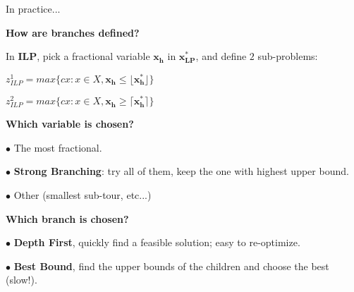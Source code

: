 \documentclass[13pt]{beamer}
\begin{document}

\begin{frame}{In practice...}
    \begin{fullpageitemize}
        \item<1->[\rtarrow]\textbf{How are branches defined?}
        \begin{baseitemize}
            \item<2->In \textbf{ILP}, pick a fractional variable $\mathbf{x_h}$ in $\mathbf{x^*_{LP}}$, and define $2$ sub-problems:
            \item<3->$z^1_{ILP} = max\{cx: x \in X, \mathbf{x_h \leq \lfloor x^*_h \rfloor}\}$
            \item<3->$z^2_{ILP} = max\{cx: x \in X, \mathbf{x_h \geq \lceil x^*_h \rceil}\}$
        \end{baseitemize}	
        \item<4->[\rtarrow]\textbf{Which variable is chosen?}
        \begin{baseitemize}
            \item<5->$\bullet$ The most fractional.
            \item<6->$\bullet$ \textbf{Strong Branching}: try all of them, keep the one with highest upper bound.
            \item<7->$\bullet$ Other (smallest sub-tour, etc...)
        \end{baseitemize}	
        \item<8->[\rtarrow]\textbf{Which branch is chosen?}
        \begin{baseitemize}
            \item<9->$\bullet$ \textbf{Depth First}, quickly find a feasible solution; easy to re-optimize.
            \item<10->$\bullet$ \textbf{Best Bound}, find the upper bounds of the children and choose the best (slow!).
        \end{baseitemize}
    \end{fullpageitemize}
\end{frame}   
\end{document}
